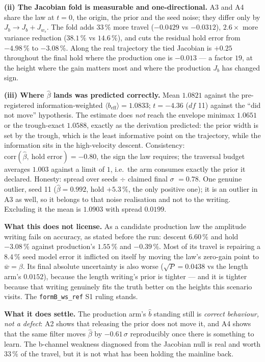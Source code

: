 \documentclass[11pt,a4paper,fontset=none]{ctexart}
\begin{document}
\textbf{(ii) The Jacobian fold is measurable and one-directional.} A3 and A4
share the law at $t=0$, the origin, the prior and the seed noise; they differ
only by $J_b \to J_b + J_{w_s}$. The fold adds $33\,\%$ more travel
($-0.0429$ vs $-0.0312$), $2.6\times$ more variance reduction
($38.1\,\%$ vs $14.6\,\%$), and cuts the residual hold error from
$-4.98\,\%$ to $-3.08\,\%$. Along the real trajectory the tied Jacobian is
$+0.25$ throughout the final hold where the production one is $-0.013$ --- a
factor $19$, at the height where the gain matters most and where the
production $J_b$ has changed sign.

\textbf{(iii) Where $\hat{\beta}$ lands was predicted correctly.}
Mean $1.0821$ against the pre-registered information-weighted
$\langle b_{\mathrm{eff}}\rangle = 1.0833$; $t = -4.36$ ($df$ 11) against the
``did not move'' hypothesis. The estimate does \emph{not} reach the envelope
minimax $1.0651$ or the trough-exact $1.0588$, exactly as the derivation
predicted: the prior width is set by the trough, which is the least
informative point on the trajectory, while the information sits in the
high-velocity descent. Consistency: $\mathrm{corr}(\hat{\beta},\ \text{hold
error}) = -0.80$, the sign the law requires; the traversal budget averages
$1.003$ against a limit of $1$, i.e.\ the arm consumes exactly the prior it
declared. Honesty: spread over seeds $\div$ claimed final $\sigma$ $= 0.78$.
One genuine outlier, seed 11 ($\hat{\beta} = 0.992$, hold $+5.3\,\%$, the only
positive one); it is an outlier in A3 as well, so it belongs to that noise
realisation and not to the writing. Excluding it the mean is $1.0903$ with
spread $0.0199$.

\textbf{What this does not license.} As a candidate production law the
amplitude writing fails on accuracy, as stated before the run: descent
$6.60\,\%$ and hold $-3.08\,\%$ against production's $1.55\,\%$ and
$-0.39\,\%$. Most of its travel is repairing a $8.4\,\%$ seed model error it
inflicted on itself by moving the law's zero-gain point to
$\bar{w} = \beta$. Its final absolute uncertainty is also worse
($\sqrt{P} = 0.0438$ vs the length arm's $0.0152$), because the length
writing's prior is tighter --- and it is tighter because that writing genuinely
fits the truth better on the heights this scenario visits. The
\texttt{formB\_ws\_ref} S1 ruling stands.

\textbf{What it does settle.} The production arm's $\hat{b}$ standing still is
\emph{correct behaviour, not a defect}: A2 shows that releasing the prior does
not move it, and A4 shows that the same filter moves $\hat{\beta}$ by
$-0.61\,\sigma$ reproducibly once there is something to learn. The b-channel
weakness diagnosed from the Jacobian null is real and worth $33\,\%$ of the
travel, but it is not what has been holding the mainline back.
\end{document}
